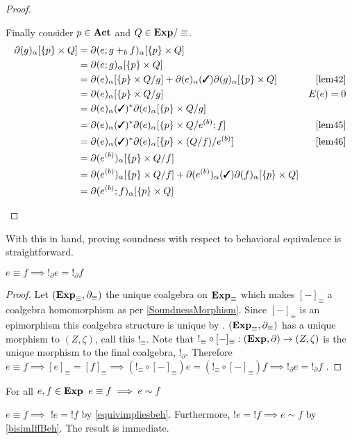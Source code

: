 \documentclass[a4paper,UKenglish,cleveref, autoref, thm-restate]{lipics-v2021}
\newcommand{\cmark}{\text{\ding{51}}}
\newcommand{\Act}{\textbf{\upshape{Act}}}
\newcommand{\Exp}{\textbf{\upshape{Exp}}}
\theoremstyle{plain}\newtheoremrep{thm}{Theorem}[section]
\begin{document}
\begin{toappendix}
\begin{proof}
\begin{enumerate}
				Finally consider $p\in \Act$ and $Q \in \Exp/\equiv$.
				\begin{align*}
					\partial(g)_\alpha[\{p\} \times Q] &= \partial(e;g+_b f)_\alpha[\{p\} \times Q] &\\
					&= \partial(e;g)_\alpha[\{p\} \times Q]\\
					&= \partial(e)_\alpha[\{p\} \times Q/g]+\partial(e)_\alpha(\cmark)\partial(g)_\alpha[\{p\} \times Q] & \cref{lem42}\\
					&= \partial(e)_\alpha[\{p\} \times Q/g] & E(e) = 0\\
					&= \partial(e)_\alpha(\cmark)^*\partial(e)_\alpha[\{p\} \times Q/g]\\
					&= \partial(e)_\alpha(\cmark)^*\partial(e)_\alpha[\{p\} \times Q/e^{(b)};f] & \cref{lem45}\\
					&= \partial(e)_\alpha(\cmark)^*\partial(e)_\alpha[\{p\} \times (Q/f)/e^{(b)}] & \cref{lem46}\\
					&= \partial(e^{(b)})_\alpha[\{p\} \times Q/f]\\
					&= \partial(e^{(b)})_\alpha[\{p\} \times Q/f] + \partial(e^{(b)})_\alpha(\cmark)\partial(f)_\alpha[\{p\} \times Q]\\
					&= \partial(e^{(b)};f)_\alpha[\{p\} \times Q]& \qedhere
				\end{align*}
			\end{enumerate} 
		\end{proof}
		With this in hand, proving soundness with respect to behavioral equivalence is straightforward.
		\begin{thm} \label{equivimpliesbeh}
			$e \equiv f \implies !_\partial e = !_\partial f$
		\end{thm}
		\begin{proof}
			Let $(\Exp_\equiv, \partial_\equiv)$ the unique coalgebra on $\Exp_\equiv$ which makes $[-]_\equiv$ a coalgebra homomorphism as per \cref{SoundnessMorphism}. Since $[-]_\equiv$ is an epimorphism this coalgebra structure is unique by \cite[Lemma 3.17]{gumm1999elements}. $(\Exp_\equiv, \partial_\equiv)$ has a unique morphism to $(Z, \zeta)$, call this $!_\equiv$. Note that $!_\equiv \circ [-]_\equiv: (\Exp, \partial) \to (Z,\zeta)$ is the unique morphism to the final coalgebra, $!_\partial$. Therefore $e\equiv f \implies [e]_\equiv = [f]_\equiv \implies (!_\equiv\circ[-]_\equiv) e = (!_\equiv\circ[-]_\equiv )f \implies !_\partial e = !_\partial f$ \cite{ToddThesis}.
		\end{proof}
	\end{toappendix}
	\begin{correp}[Soundness]
		For all $e,f \in \Exp\;\; e\equiv f \implies e \sim f$\label{soundness}
	\end{correp}
	\begin{appendixproof}
		$e \equiv f \implies$ $!e = !f$ by \cref{equivimpliesbeh}. Furthermore, $!e = !f \implies e \sim f$ by \cref{bisimIffBeh}. The result is immediate.
	\end{appendixproof}
\end{document}
